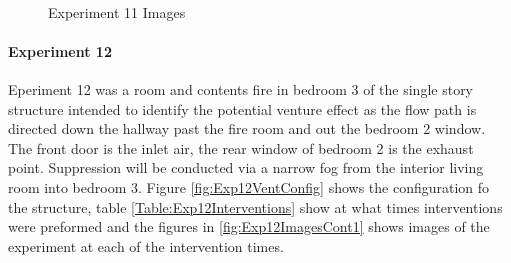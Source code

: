 \documentclass{article}
\begin{document}
\begin{figure}[H]
	\ContinuedFloat 
	\centering 
	 \ 
	 \ 
	\caption{Experiment 11 Images}
	\label{fig:Experiment11ImagesCont3} 
\end{figure}

\paragraph{Experiment 12}\mbox{}

Eperiment 12 was a room and contents fire in bedroom 3 of the single story structure intended to identify the potential venture effect as the flow path is directed down the hallway past the fire room and out the bedroom 2 window. The front door is the inlet air, the rear window of bedroom 2 is the exhaust point. Suppression will be conducted via a narrow fog from the interior living room into bedroom 3. Figure \ref{fig:Exp12VentConfig} shows the configuration fo the structure, table \ref{Table:Exp12Interventions} show at what times interventions were preformed and the figures in \ref{fig:Exp12ImagesCont1} shows images of the experiment at each of the intervention times.
\end{document}
